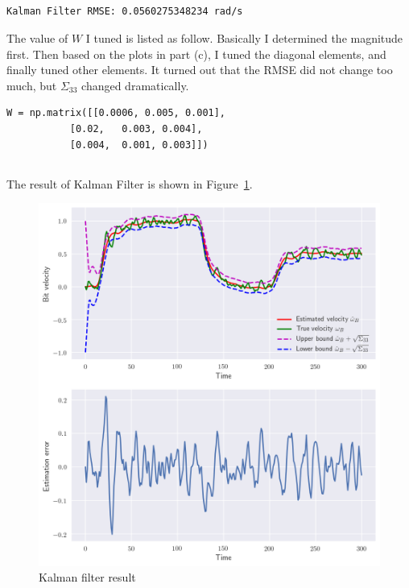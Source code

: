 \documentclass[12pt]{article}
\begin{document}
\subsection{}

\begin{Verbatim}
Kalman Filter RMSE: 0.0560275348234 rad/s
\end{Verbatim}
The value of $W$ I tuned is listed as follow. Basically I determined the magnitude first. Then based on the plots in part (c), I tuned the diagonal elements, and finally tuned other elements. It turned out that the RMSE did not change too much, but $\Sigma_{33}$ changed dramatically. 
\begin{Verbatim}
W = np.matrix([[0.0006, 0.005, 0.001], 
	       [0.02,   0.003, 0.004], 
	       [0.004,  0.001, 0.003]])
\end{Verbatim}
\subsection{}

The result of Kalman Filter is shown in Figure~\ref{fig:5}.
\begin{figure}[H]
	\centering
	\includegraphics[width=\linewidth]{5.png}      
	\caption{Kalman filter result}
	\label{fig:5}
\end{figure}
\end{document}
